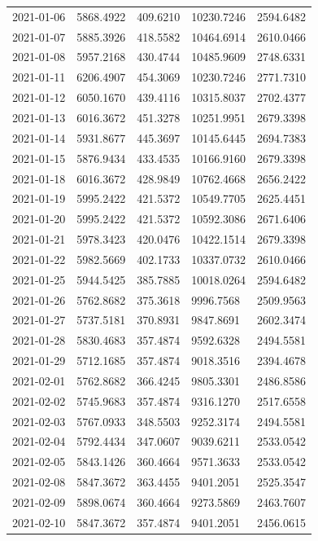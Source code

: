 \begin{footnotesize}
\begin{longtable}{lllll}
2021-01-06 & 5868.4922 & 409.6210 & 10230.7246 & 2594.6482 \\
2021-01-07 & 5885.3926 & 418.5582 & 10464.6914 & 2610.0466 \\
2021-01-08 & 5957.2168 & 430.4744 & 10485.9609 & 2748.6331 \\
2021-01-11 & 6206.4907 & 454.3069 & 10230.7246 & 2771.7310 \\
2021-01-12 & 6050.1670 & 439.4116 & 10315.8037 & 2702.4377 \\
2021-01-13 & 6016.3672 & 451.3278 & 10251.9951 & 2679.3398 \\
2021-01-14 & 5931.8677 & 445.3697 & 10145.6445 & 2694.7383 \\
2021-01-15 & 5876.9434 & 433.4535 & 10166.9160 & 2679.3398 \\
2021-01-18 & 6016.3672 & 428.9849 & 10762.4668 & 2656.2422 \\
2021-01-19 & 5995.2422 & 421.5372 & 10549.7705 & 2625.4451 \\
2021-01-20 & 5995.2422 & 421.5372 & 10592.3086 & 2671.6406 \\
2021-01-21 & 5978.3423 & 420.0476 & 10422.1514 & 2679.3398 \\
2021-01-22 & 5982.5669 & 402.1733 & 10337.0732 & 2610.0466 \\
2021-01-25 & 5944.5425 & 385.7885 & 10018.0264 & 2594.6482 \\
2021-01-26 & 5762.8682 & 375.3618 & 9996.7568 & 2509.9563 \\
2021-01-27 & 5737.5181 & 370.8931 & 9847.8691 & 2602.3474 \\
2021-01-28 & 5830.4683 & 357.4874 & 9592.6328 & 2494.5581 \\
2021-01-29 & 5712.1685 & 357.4874 & 9018.3516 & 2394.4678 \\
2021-02-01 & 5762.8682 & 366.4245 & 9805.3301 & 2486.8586 \\
2021-02-02 & 5745.9683 & 357.4874 & 9316.1270 & 2517.6558 \\
2021-02-03 & 5767.0933 & 348.5503 & 9252.3174 & 2494.5581 \\
2021-02-04 & 5792.4434 & 347.0607 & 9039.6211 & 2533.0542 \\
2021-02-05 & 5843.1426 & 360.4664 & 9571.3633 & 2533.0542 \\
2021-02-08 & 5847.3672 & 363.4455 & 9401.2051 & 2525.3547 \\
2021-02-09 & 5898.0674 & 360.4664 & 9273.5869 & 2463.7607 \\
2021-02-10 & 5847.3672 & 357.4874 & 9401.2051 & 2456.0615 \\

\end{longtable}
\end{footnotesize}
